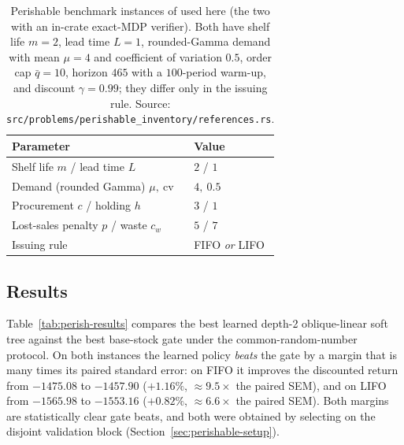 \begin{table}[!htbp]
\centering
\caption{Perishable benchmark instances of \citet{deMoor2022perishable} used here (the two with an
in-crate exact-MDP verifier). Both have shelf life $m=2$, lead time $L=1$, rounded-Gamma demand with
mean $\mu=4$ and coefficient of variation $0.5$, order cap $\bar q=10$, horizon $465$ with a
$100$-period warm-up, and discount $\gamma=0.99$; they differ only in the issuing rule. Source:
\texttt{src/problems/perishable\_inventory/references.rs}.}
\label{tab:perish-params}
\begin{tabular}{ll}
\toprule
Parameter & Value \\
\midrule
Shelf life $m$ / lead time $L$ & $2$ / $1$ \\
Demand (rounded Gamma) $\mu,\ \mathrm{cv}$ & $4,\ 0.5$ \\
Procurement $c$ / holding $h$ & $3$ / $1$ \\
Lost-sales penalty $p$ / waste $c_w$ & $5$ / $7$ \\
Issuing rule & FIFO \emph{or} LIFO \\
\bottomrule
\end{tabular}
\end{table}
\FloatBarrier

\subsection{Results}
\label{sec:perishable-results}

Table~\ref{tab:perish-results} compares the best learned depth-2 oblique-linear soft tree against the
best base-stock gate under the common-random-number protocol. On both instances the learned policy
\emph{beats} the gate by a margin that is many times its paired standard error: on FIFO it improves
the discounted return from $-1475.08$ to $-1457.90$ ($+1.16\%$, $\approx9.5\times$ the paired SEM),
and on LIFO from $-1565.98$ to $-1553.16$ ($+0.82\%$, $\approx6.6\times$ the paired SEM). Both margins
are statistically clear gate beats, and both were obtained by selecting on the disjoint validation
block (Section~\ref{sec:perishable-setup}).


